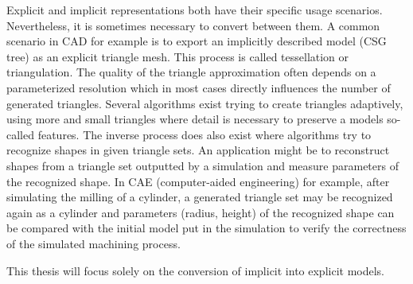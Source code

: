 Explicit and implicit representations both have their specific usage scenarios. Nevertheless, it is sometimes necessary to convert between them.
A common scenario in CAD for example is to export an implicitly described model (\eg CSG tree) as an explicit triangle mesh. This process is called tessellation or triangulation. The quality of the triangle approximation often depends on a parameterized resolution which in most cases directly influences the number of generated triangles. Several algorithms exist trying to create triangles adaptively, using more and small triangles where detail is necessary to preserve a models so-called features.
The inverse process does also exist where algorithms try to recognize shapes in given triangle sets. An application might be to reconstruct shapes from a triangle set outputted by a simulation and measure parameters of the recognized shape. In CAE (computer-aided engineering) for example, after simulating the milling of a cylinder, a generated triangle set may be recognized again as a cylinder and parameters (\eg radius, height) of the recognized shape can be compared with the initial model put in the simulation to verify the correctness of the simulated machining process.

This thesis will focus solely on the conversion of implicit into explicit models.